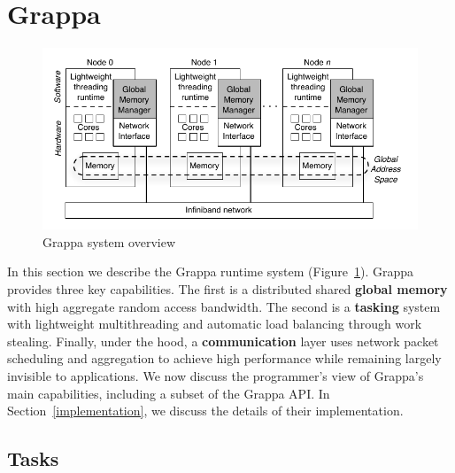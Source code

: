 \section{Grappa} \label{sec:grappa}

\begin{figure}[t]
\begin{center}
  \includegraphics[width=0.95\columnwidth]{figs/system-overview}
\begin{minipage}{0.95\columnwidth}
  \caption{\label{fig:grappa} Grappa system overview}
\end{minipage}
\vspace{-3ex}
\end{center}
\end{figure}

In this section we describe the Grappa runtime system
(Figure~\ref{fig:grappa}). Grappa provides three key capabilities. The
first is a distributed shared \textbf{global memory} with high aggregate
random access bandwidth. The second is a \textbf{tasking} system with
lightweight multithreading and automatic load balancing through work
stealing. Finally, under the hood, a \textbf{communication} layer uses
network packet scheduling and aggregation to achieve high performance
while remaining largely invisible to applications. We now discuss the
programmer's view of Grappa's main capabilities, including a subset of
the Grappa API. In Section~\ref{implementation}, we discuss the details
of their implementation.


\subsection{Tasks}


